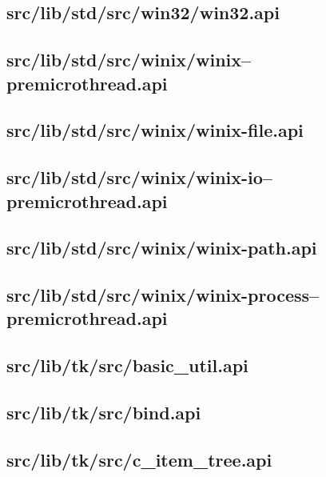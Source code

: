 \subsection{src/lib/std/src/win32/win32.api}


\subsection{src/lib/std/src/winix/winix--premicrothread.api}


\subsection{src/lib/std/src/winix/winix-file.api}


\subsection{src/lib/std/src/winix/winix-io--premicrothread.api}


\subsection{src/lib/std/src/winix/winix-path.api}


\subsection{src/lib/std/src/winix/winix-process--premicrothread.api}


\subsection{src/lib/tk/src/basic\_util.api}


\subsection{src/lib/tk/src/bind.api}


\subsection{src/lib/tk/src/c\_item\_tree.api}


